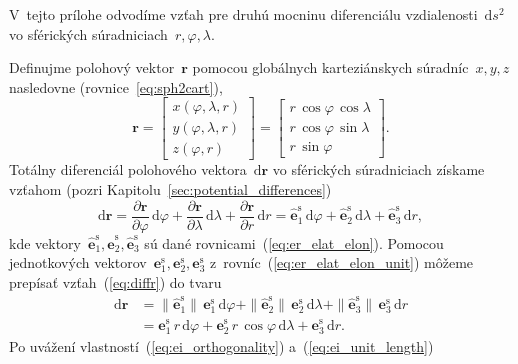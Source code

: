 \documentclass[a4paper, 12pt]{book}
\newcommand{\diff}{\mathrm d}
\let\vec\mathbf
\begin{document}
V~tejto prílohe odvodíme vzťah pre druhú mocninu diferenciálu 
vzdialenosti~$\diff s^2$ vo sférických súradniciach~$r, \varphi, \lambda$.

Definujme polohový vektor~$\vec r$ pomocou globálnych karteziánskych 
súradníc~$x, y, z$ nasledovne (rovnice~\ref{eq:sph2cart}),
%
\begin{equation}
\vec r =
%
\begin{bmatrix}
x(\varphi, \lambda, r)\\
y(\varphi, \lambda, r)\\
z(\varphi, r)
\end{bmatrix}
%
=
%
\begin{bmatrix}
r \, \cos\varphi \, \cos\lambda\\
r \, \cos\varphi \, \sin\lambda\\
r \, \sin\varphi
\end{bmatrix}
%
{.}
\end{equation}
%
Totálny diferenciál polohového vektora~$\diff \vec r$ vo sférických 
súradniciach získame vzťahom (pozri Kapitolu~\ref{sec:potential_differences})
%
\begin{equation}
\label{eq:diffr}
\diff \vec r = \frac{\partial \vec r}{\partial \varphi} \, \diff \varphi 
+ \frac{\partial \vec r}{\partial \lambda} \, \diff \lambda + \frac{\partial 
\vec r}{\partial r} \, \diff r = \hat{\vec e}_1^\mathrm{s} \, \diff \varphi 
+ \hat{\vec e}_2^\mathrm{s} \, \diff \lambda + \hat{\vec e}_3^\mathrm{s} \, 
\diff r{,}
\end{equation}
%
kde vektory~$\hat{\vec e}_1^\mathrm{s}, \hat{\vec e}_2^\mathrm{s}, \hat{\vec 
e}_3^\mathrm{s}$ sú dané rovnicami~(\ref{eq:er_elat_elon}).  Pomocou 
jednotkových vektorov~$\vec e_1^\mathrm{s}, \vec e_2^\mathrm{s}, \vec 
e_3^\mathrm{s}$ z~rovníc~(\ref{eq:er_elat_elon_unit}) môžeme prepísať 
vzťah~(\ref{eq:diffr}) do tvaru
%
\begin{equation}
\label{eq:diffr2}
\begin{split}
\diff \vec r &= \|\hat{\vec e}_1^\mathrm{s}\| \,\vec e_1^\mathrm{s} \, 
\diff\varphi + \|\hat{\vec e}_2^\mathrm{s}\| \, \vec e_2^\mathrm{s} \, 
\diff\lambda + \|\hat{\vec e}_3^\mathrm{s}\| \, \vec e_3^\mathrm{s} \, \diff 
r\\
%
&= \vec e_1^\mathrm{s} \, r \, \diff\varphi + \vec e_2^\mathrm{s} \, r \, 
\cos\varphi \, \diff\lambda + \vec e_3^\mathrm{s} \, \diff r{.}
\end{split}
\end{equation}
%
Po uvážení vlastností~(\ref{eq:ei_orthogonality}) a~(\ref{eq:ei_unit_length}) 
\end{document}
